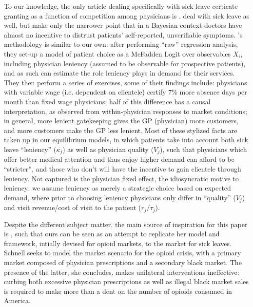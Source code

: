 \documentclass[../main.tex]{subfiles}
\begin{document}
To our knowledge, the only article dealing specifically with sick leave certicate granting as a function of competition among physicians is \cite{markussen-roed}. \cite{cln} deal with sick leave as well, but make only the narrower point that in a Bayesian context doctors have almost no incentive to distrust patients' self-reported, unverifiable symptoms. \citeauthor{markussen-roed}'s methodology is similar to our own: after performing ``raw'' regression analysis, they set-up a model of patient choice as a McFadden Logit over observables $X_i$, including physician leniency (assumed to be observable for prospective patients), and as such can estimate the role leniency plays in demand for their services. They then perform a series of exercises, some of their findings include: physicians with variable wage (i.e. dependent on clientele) certify 7\% more absence days per month than fixed wage physicians; half of this difference has a causal interpretation, as observed from within-physician responses to market conditions; in general, more lenient gatekeeping gives the GP (physician) more customers, and more customers make the GP less lenient. Most of these stylized facts are taken up in our equilibrium models, in which patients take into account both sick leave ``leniency'' ($\bar{\kappa_j}$) as well as physician quality ($V_j$), such that physicians which offer better medical attention and thus enjoy higher demand can afford to be ``stricter'', and those who don't will have the incentive to gain clientele through leniency. Not captured is the physician fixed effect, the idiosyncratic motive to leniency: we assume leniency as merely a strategic choice based on expected demand, where prior to choosing leniency physicians only differ in ``quality'' ($V_j$) and visit revenue/cost of visit to the patient ($r_j / \tau_j$).

Despite the different subject matter, the main source of inspiration for this paper is \cite{schnell2017physician}, such that ours can be seen as an attempt to replicate her model and framework, intially devised for opioid markets, to the market for sick leaves. Schnell seeks to model the market scenario for the opioid crisis, with a primary market composed of physician prescriptions and a secondary black market. The presence of the latter, she concludes, makes unilateral interventions ineffective: curbing both excessive physician prescriptions as well as illegal black market sales is required to make more than a dent on the number of opioids consumed in America.
\end{document}
